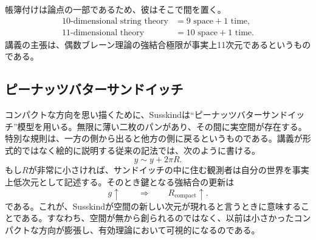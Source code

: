帳簿付けは論点の一部であるため、彼はそこで間を置く。
\begin{equation}
\begin{aligned}
10\text{-dimensional string theory} &= 9\text{ space}+1\text{ time},\\
11\text{-dimensional theory} &= 10\text{ space}+1\text{ time}.
\end{aligned}
\end{equation}
講義の主張は、偶数ブレーン理論の強結合極限が事実上11次元であるというものである。


\subsection{ピーナッツバターサンドイッチ}

コンパクトな方向を思い描くために、Susskindは``ピーナッツバターサンドイッチ''模型を用いる。無限に薄い二枚のパンがあり、その間に実空間が存在する。特別な規則は、一方の側から出ると他方の側に戻るというものである。講義が形式的ではなく絵的に説明する従来の記法では、次のように書ける。
\begin{equation}
y \sim y + 2\pi R.
\end{equation}
もし\(R\)が非常に小さければ、サンドイッチの中に住む観測者は自分の世界を事実上低次元として記述する。そのとき鍵となる強結合の更新は
\begin{equation}
g\uparrow
\qquad \Longrightarrow \qquad
R_{\mathrm{compact}}\uparrow.
\end{equation}
である。これが、Susskindが空間の新しい次元が現れると言うときに意味することである。すなわち、空間が無から創られるのではなく、以前は小さかったコンパクトな方向が膨張し、有効理論において可視的になるのである。

